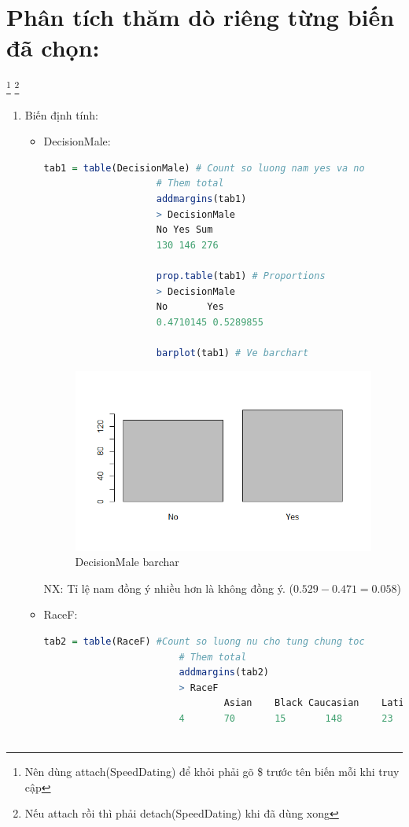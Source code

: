 \documentclass[a4paper,12pt]{article}
\begin{document}
	\section{Phân tích thăm dò riêng từng biến đã chọn:}
		\footnote{Nên dùng attach(SpeedDating) để khỏi phải gõ \$ trước tên biến mỗi khi truy cập}
		\footnote{Nếu attach rồi thì phải detach(SpeedDating) khi đã dùng xong}
		\begin{enumerate}[label = {\alph*)}]
			\item Biến định tính:
				\begin{itemize}
					\item DecisionMale:\\
					
					\begin{lstlisting}[language = R]
					tab1 = table(DecisionMale) # Count so luong nam yes va no
					# Them total
					addmargins(tab1)
					> DecisionMale
					No Yes Sum 
					130 146 276
					
					prop.table(tab1) # Proportions
					> DecisionMale
					No       Yes 
					0.4710145 0.5289855 
					
					barplot(tab1) # Ve barchart
					\end{lstlisting}
						
						\begin{figure}[H]
							\centering
							\includegraphics[width=\linewidth]{Images/Rplot01}
							\caption[]{DecisionMale barchar}
						\end{figure}
					
					NX: Tỉ lệ nam đồng ý nhiều hơn là không đồng ý. ($0.529 - 0.471 = 0.058$)
					
					\item RaceF:\\
						\begin{lstlisting}[language = R]
						tab2 = table(RaceF) #Count so luong nu cho tung chung toc
						# Them total
						addmargins(tab2)
						> RaceF
								Asian    Black Caucasian    Latino    Other       Sum 
						4       70       15       148       23        16      	   276
						

\end{lstlisting}
\end{itemize}
\end{enumerate}
\end{document}
